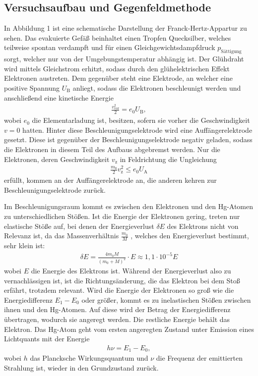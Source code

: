 \subsection{Versuchsaufbau und Gegenfeldmethode}
In Abbildung 1 ist eine schematische Darstellung der Franck-Hertz-Appartur zu sehen.
Das evakuierte Gefäß beinhaltet einen Tropfen Quecksilber, welches teilweise spontan verdampft
und für einen Gleichgewichtsdampfdruck $p_\text{Sättigung}$ sorgt, welcher nur von der
Umgebungstemperatur abhängig ist.
Der Glühdraht wird mittels Gleichstrom erhitzt, sodass durch den glühelektrischen Effekt
Elektronen austreten. Dem gegenüber steht eine Elektrode, an welcher eine positive
Spannung $U_\text{B}$ anliegt, sodass die Elektronen beschleunigt werden und anschließend
eine kinetische Energie
\begin{align}
\frac{v_\text{vor}^{2}}{2} = e_\text{0} U_\text{B},
\end{align}
wobei $e_\text{0}$ die Elementarladung ist, besitzen, sofern sie vorher die Geschwindigkeit $v = 0$ hatten.
Hinter diese Beschleunigungselektrode wird eine Auffängerelektrode gesetzt. 
Diese ist gegenüber der Beschleunigungselektrode negativ geladen, 
sodass die Elektronen in diesem Teil des Aufbaus abgebremst werden. Nur die Elektronen,
 deren Geschwindigkeit $v_\text{z}$ in Feldrichtung die Ungleichung
\begin{align*}
\frac{m_\text{0}}{2} v_\text{z}^{2} \leq e_\text{0} U_\text{A}
\end{align*}
erfüllt, kommen an der Auffängerelektrode an, die anderen kehren zur Beschleunigungselektrode zurück.

Im Beschleunigungsraum kommt es zwischen den Elektronen und den Hg-Atomen zu
unterschiedlichen Stößen. Ist die Energie der Elektronen gering, treten nur elastische Stöße
auf, bei denen der Energieverlust $\delta E$ des Elektrons nicht von Relevanz ist, da das
Massenverhältnis $\frac{m_\text{0}}{M}$ , welches den Energieverlust bestimmt, sehr klein ist:
\begin{align*}
\delta E = \frac{4 m_\text{0} M}{(m_\text{0} + M)^{2}} \cdot E \approx 1,1 \cdot 10^{-5} E
\end{align*}
wobei $E$ die Energie des Elektrons ist. Während der Energieverlust also zu vernachlässigen ist, 
ist die Richtungsänderung, die das Elektron bei dem Stoß erfährt, trotzdem
relevant. 
Wird die Energie der Elektronen so groß wie die Energiedifferenz
$E_\text{1} - E_\text{0}$ oder größer, kommt es zu inelastischen Stößen zwischen ihnen und den
Hg-Atomen. Auf diese wird der Betrag der Energiedifferenz übertragen, wodurch
sie angeregt werden. Die restliche Energie behält das Elektron. Das Hg-Atom geht vom
ersten angeregten Zustand unter Emission eines Lichtquants mit der Energie 
\begin{align}
h \nu = E_\text{1} - E_\text{0},
\end{align}
wobei $h$ das Plancksche Wirkungsquantum und $\nu$ die Frequenz der emittierten Strahlung
ist, wieder in den Grundzustand zurück.


